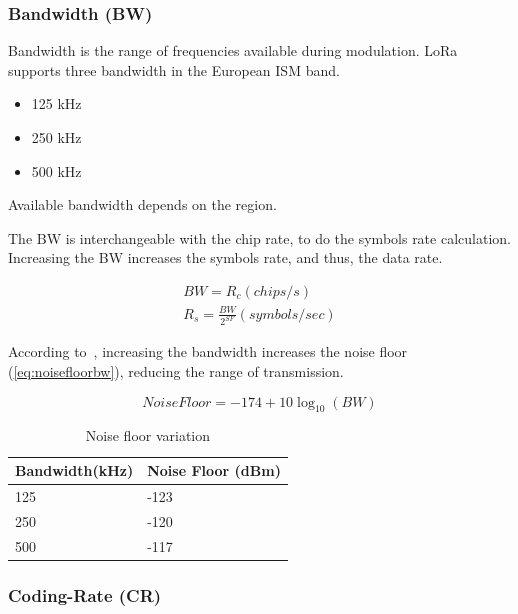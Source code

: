 \subsubsection{Bandwidth (BW)}

Bandwidth is the range of frequencies available during modulation.
LoRa supports three bandwidth in the European ISM band.

\begin{itemize}
    \item 125 kHz
    \item 250 kHz
    \item 500 kHz
\end{itemize}

Available bandwidth depends on the region. %

The BW is interchangeable with the chip rate, to do the symbols rate
calculation.
Increasing the BW increases the symbols rate, and thus, the data rate.

\begin{gather}
 \label{eq:bw} 
  BW = R_c (chips/s) \\
  R_s = \frac{BW}{2^{SF}} (symbols / sec)
\end{gather}

According to~\cite{semtech:modulationbasics}, increasing the
bandwidth increases the noise floor (\ref{eq:noisefloorbw}), reducing the
range of transmission.

\begin{equation}
 \label{eq:noisefloorbw} 
  Noise Floor = -174 + 10 \log_{10}(BW)
\end{equation}


\begin{table}[h!]
\centering
\begin{tabular}{@{}ll@{}}
Bandwidth(kHz) & Noise Floor (dBm) \\ \midrule
125            & -123              \\
250            & -120              \\
500            & -117              \\ \bottomrule
\end{tabular}
\caption{Noise floor variation\label{table:bw}}
\end{table}


\subsubsection{Coding-Rate (CR)}

